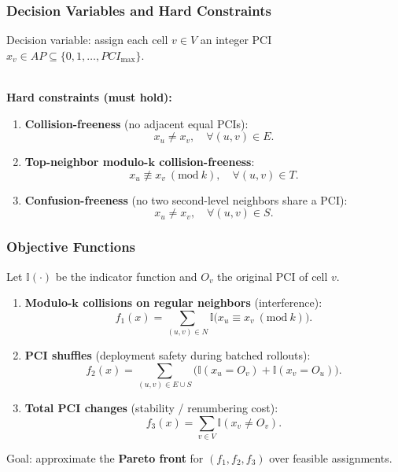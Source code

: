 \documentclass[
	11pt, %
	aspectratio=169, %
]{beamer}
\begin{document}
\begin{frame}
\frametitle{Decision Variables and Hard Constraints}

Decision variable: assign each cell $v \in V$ an integer PCI $x_{v} \in AP \subseteq \{0, 1, \dots, PCI_{\max}\}$.

~\\

\textbf{Hard constraints (must hold):}
\begin{enumerate}
\item \textbf{Collision-freeness} (no adjacent equal PCIs):
\[
x_{u} \neq x_{v},\quad \forall (u, v) \in E.
\]

\item \textbf{Top-neighbor modulo-$\mathbf{k}$ collision-freeness}:
\[
x_{u} \not\equiv x_{v} \ (\mathrm{mod}\ k),\quad \forall (u, v) \in T.
\]

\item \textbf{Confusion-freeness} (no two second-level neighbors share a PCI):
\[
x_{u} \neq x_{v}, \quad \forall (u, v) \in S.
\]
\end{enumerate}

\end{frame}

\begin{frame}
\frametitle{Objective Functions}

Let $\mathbb{I}(\cdot)$ be the indicator function and $O_{v}$ the original PCI of cell $v$.

\begin{enumerate}
\item \textbf{Modulo-$\mathbf{k}$ collisions on regular neighbors} (interference):
\[
f_{1}(x) = \sum_{(u, v) \in N}{\mathbb{I}\big(x_{u} \equiv x_{v} \ (\mathrm{mod}\ k)\big)}.
\]

\item \textbf{PCI shuffles} (deployment safety during batched rollouts):
\[
f_{2}(x) = \sum_{(u, v) \in E \cup S}{\Big(\mathbb{I}(x_{u} = O_{v}) + \mathbb{I}(x_{v} = O_{u})\Big)}.
\]

\item \textbf{Total PCI changes} (stability / renumbering cost):
\[
f_{3}(x) = \sum_{v \in V}{\mathbb{I}(x_{v} \neq O_{v})}.
\]
\end{enumerate}

\medskip
Goal: approximate the \textbf{Pareto front} for $(f_{1}, f_{2}, f_{3})$ over feasible assignments.

\end{frame}
\end{document}
